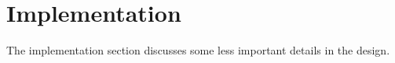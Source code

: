 \section{Implementation}
\label{sec:implementation}

The implementation section discusses some less important details in the design.
